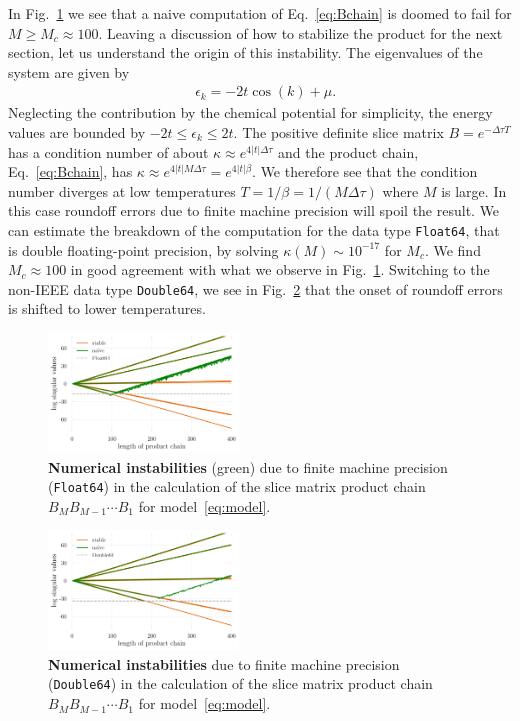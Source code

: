 \documentclass[%
 reprint,
superscriptaddress,
showpacs,
 amsmath,amssymb,
 aps,
 prb,
longbibliography,
]{revtex4-1}
\begin{document}
In Fig.~\ref{fig:naive_vs_stable} we see that a naive computation of Eq.~\ref{eq:Bchain} is doomed to fail for $M \geq M_c \approx 100$. Leaving a discussion of how to stabilize the product for the next section, let us understand the origin of this instability. The eigenvalues of the system are given by
\begin{align}
	&\epsilon_k = -2t\cos(k) + \mu.
\end{align}
Neglecting the contribution by the chemical potential for simplicity, the energy values are bounded by $-2t \leq \epsilon_k \leq 2t$. The positive definite slice matrix $B = e^{-\Delta \tau T}$ has a condition number of about $\kappa \approx e^{4|t|\Delta \tau}$ and the product chain, Eq.~\ref{eq:Bchain}, has $\kappa \approx e^{4|t|M\Delta \tau} = e^{4|t|\beta}$. We therefore see that the condition number diverges at low temperatures $T=1/\beta = 1/(M \Delta\tau)$ where $M$ is large. In this case roundoff errors due to finite machine precision will spoil the result. We can estimate the breakdown of the computation for the data type \texttt{Float64}, that is double floating-point precision\cite{Goldberg1991}, by solving $\kappa(M) \sim 10^{-17}$ for $M_c$. We find $M_c \approx 100$ in good agreement with what we observe in Fig.~\ref{fig:naive_vs_stable}. Switching to the non-IEEE data type \texttt{Double64}, we see in Fig.~\ref{fig:naive_vs_stable_db64} that the onset of roundoff errors is shifted to lower temperatures.

\begin{figure}[t]
	\includegraphics[width=0.45\textwidth]{../notebooks/naive_vs_stable.pdf}
	\caption{\textbf{Numerical instabilities} (green) due to finite machine precision (\texttt{Float64}) in the calculation of the slice matrix product chain $B_M B_{M-1} \cdots B_1$ for model~\eqref{eq:model}. \label{fig:naive_vs_stable}}
\end{figure}

\begin{figure}[t]
	\includegraphics[width=0.45\textwidth]{../notebooks/naive_vs_stable_db64.pdf}
	\caption{\textbf{Numerical instabilities} due to finite machine precision (\texttt{Double64}) in the calculation of the slice matrix product chain $B_M B_{M-1} \cdots B_1$ for model~\eqref{eq:model}. \label{fig:naive_vs_stable_db64}}
\end{figure}
\end{document}
